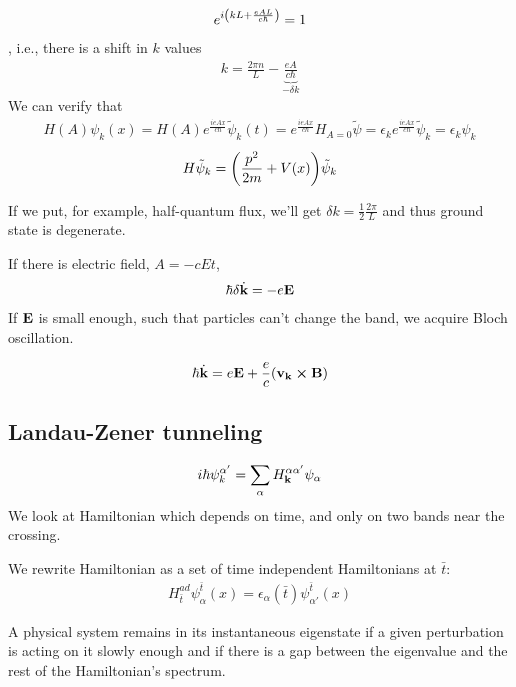 \begin{align}
e^{i\qty(kL+\frac{eAL}{c\hbar})} = 1 
\end{align}
, i.e., there is a shift in $k$ values
\begin{align}
k = \frac{2\pi n}{L} - \underbrace{\frac{eA}{c\hbar} }_{- \delta k}
\end{align}
We can verify that
\begin{align}
H(A) \psi_k(x) = H(A) e^{\frac{ieAx}{c\hbar}}   \tilde{\psi}_k(t) = e^{\frac{ieAx}{c\hbar}}  H_{A=0} \tilde{\psi}= \epsilon_k e^{\frac{ieAx}{c\hbar}}  \tilde{\psi}_k = \epsilon_k \psi_k  
\end{align}
\begin{align}
H\tilde{\psi}_k = \qty(\frac{p^2}{2m} + V(x)) \tilde{\psi}_k
\end{align}

If we put, for example, half-quantum flux, we'll get $\delta k = \frac{1}{2} \frac{2\pi}{L}$ and thus ground state is degenerate.

If there is electric field, $A=-cEt$,
\begin{align}
\hbar\delta \dot{ \vb{k}} = -e\vb{E}
\end{align} 
If $\vb{E}$ is small enough, such that particles can't change the band, we acquire Bloch oscillation.

\begin{prop}
	\begin{align}
	\hbar \dot{ \vb{k}} = e\vb{E} + \frac{e}{c} \qty(\vb{v}_{\vb{k}} \cross \vb{B})
	\end{align}
\end{prop}

\subsection{Landau-Zener tunneling}
\begin{align}
i\hbar \psi_k^{\alpha'} = \sum_{\alpha} H_{\vb{k}}^{\alpha \alpha'} \psi_{\alpha}
\end{align}
We look at Hamiltonian which depends on time, and only on two bands near the crossing.

We rewrite Hamiltonian as a set of time independent Hamiltonians at $\bar{t}$:
\begin{align}
H_{\bar{t}}^{ad} \psi_{\alpha}^{\bar{t}}(x) = \epsilon_{\alpha}(\bar{t}) \psi_{\alpha'}^{\bar{t}} (x)
\end{align}
\begin{theorem}
	A physical system remains in its instantaneous eigenstate if a given perturbation is acting on it slowly enough and if there is a gap between the eigenvalue and the rest of the Hamiltonian's spectrum.
\end{theorem}

